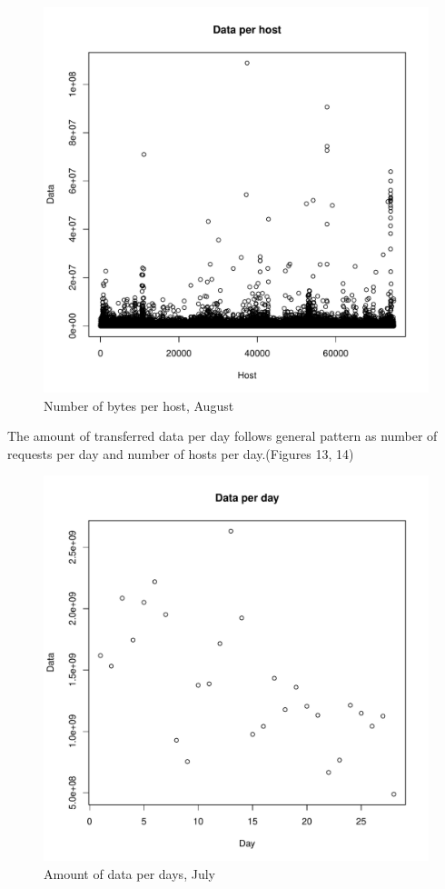 \documentclass[english]{article}
\begin{document}
\begin{figure}[H]
\centerline{\includegraphics{Weblogs/Aug/DataPerHost.pdf}}
\caption{Number of bytes per host, August}
\end{figure}
The amount of transferred data per day follows general pattern as number of requests per day and number of hosts per day.(Figures 13, 14)
\begin{figure}[H]
\centerline{\includegraphics{Weblogs/Jul/DataPerDay.pdf}}
\caption{Amount of data per days, July}
\end{figure}
\end{document}

